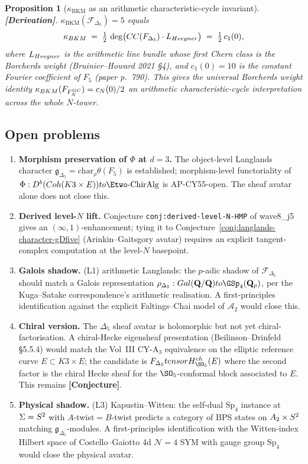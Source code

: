 \documentclass[11pt]{amsart}
\newtheorem{proposition}[theorem]{Proposition}
\theoremstyle{definition}
\providecommand{\kBKM}{\kappa_{\mathrm{BKM}}}
\providecommand{\Coh}{\mathrm{Coh}}
\providecommand{\Sp}{\mathrm{Sp}}
\providecommand{\cH}{\mathcal{H}}
\providecommand{\cL}{\mathcal{L}}
\providecommand{\cF}{\mathcal{F}}
\providecommand{\bQ}{\mathbf{Q}}
\providecommand{\Dfive}{\Delta_5}
\providecommand{\gDfive}{\mathfrak{g}_{\Dfive}}
\providecommand{\CharCyc}{\mathrm{CC}}
\providecommand{\ClaimStatusDerivation}{\textbf{[Derivation]}}
\providecommand{\ClaimStatusConjectured}{\textbf{[Conjecture]}}
\begin{document}
\begin{proposition}[$\kBKM$ as an arithmetic characteristic-cycle
invariant]
\label{prop:kBKM-arithmetic-cc}
\ClaimStatusDerivation.
$\kBKM(\cF_{\Dfive}) = 5$ equals
\[
 \kBKM \;=\; \tfrac{1}{2}\, \deg \bigl(\CharCyc(\cF_{\Dfive}) \cdot
 \hat{\cL}_{\rm Heegner}\bigr)
 \;=\; \tfrac{1}{2}\, c_1(0),
\]
where $\hat{\cL}_{\rm Heegner}$ is the arithmetic line bundle whose
first Chern class is the Borcherds weight (Bruinier--Howard 2021
\S 4), and $c_1(0) = 10$ is the constant Fourier coefficient of $F_5$
(paper p.~790). This gives the \emph{universal Borcherds weight
identity} $\kBKM(\cF_{F^{\rm GC}_N}) = c_N(0)/2$ an arithmetic
characteristic-cycle interpretation across the whole $N$-tower.
\end{proposition}

\subsection{Open problems}

\begin{enumerate}[label=(\arabic*)]
\item \textbf{Morphism preservation of $\Phi$ at $d = 3$.} The
object-level Langlands character $\gDfive = \mathrm{char}_\rho
\theta(F_5)$ is established; morphism-level functoriality of
$\Phi \colon D^b(\Coh(K3 \times E)) \to \Etwo\text{-ChirAlg}$ is
AP-CY55-open. The sheaf avatar alone does not close this.
\item \textbf{Derived level-$N$ lift.} Conjecture
\texttt{conj:derived-level-N-HMP} of wave8\_j5 gives an
$(\infty, 1)$-enhancement; tying it to
Conjecture~\ref{conj:langlands-character-gDfive}
(Arinkin--Gaitsgory avatar) requires an explicit tangent-complex
computation at the level-$N$ basepoint.
\item \textbf{Galois shadow.} (L1) arithmetic Langlands: the $p$-adic
shadow of $\cF_{\Dfive}$ should match a Galois representation
$\rho_{\Dfive} \colon \mathrm{Gal}(\overline{\bQ}/\bQ) \to
\GSp_4(\bQ_p)$, per the Kuga--Satake correspondence's arithmetic
realisation. A first-principles identification against the explicit
Faltings--Chai model of $\mathcal{A}_2$ would close this.
\item \textbf{Chiral version.} The $\Dfive$ sheaf avatar is
holomorphic but not yet chiral-factorisation. A chiral-Hecke
eigensheaf presentation (Beilinson--Drinfeld \S 5.5.4) would match
the Vol~III CY-A$_3$ equivalence on the elliptic reference curve
$E \subset K3 \times E$; the candidate is
$\cF_{\Dfive} \otimes \cH^{\rm ch}_{\SO_5}(E)$ where the second
factor is the chiral Hecke sheaf for the $\SO_5$-conformal block
associated to $E$. This remains \ClaimStatusConjectured.
\item \textbf{Physical shadow.} (L3) Kapustin--Witten: the
self-dual $\Sp_4$ instance at $\Sigma = S^2$ with $A$-twist$=B$-twist
predicts a category of BPS states on $A_2 \times S^2$
matching $\gDfive$-modules. A first-principles identification with
the Witten-index Hilbert space of Costello--Gaiotto 4d
$\mathcal{N}=4$ SYM with gauge group $\Sp_4$ would close the physical
avatar.
\end{enumerate}
\end{document}
